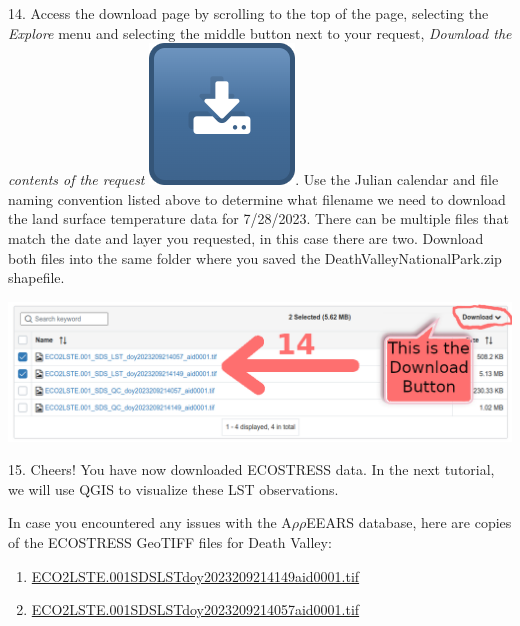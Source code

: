 \documentclass[oneside,a4paper,11pt,explicit]{book}
\begin{document}
14. Access the download page by scrolling to the top of the page, selecting the \textit{Explore} menu and selecting the middle button next to your request, \textit{Download the contents of the request} \includegraphics[height=\fontcharht\font`\B]{DownloadButton.png}. Use the Julian calendar and file naming convention listed above to determine what filename we need to download the land surface temperature data for 7/28/2023. There can be multiple files that match the date and layer you requested, in this case there are two. Download both files into the same folder where you saved the DeathValleyNationalPark.zip shapefile.

\centerline{\includegraphics[width=\textwidth]{DownloadInstructions.png}}

15. Cheers! You have now downloaded ECOSTRESS data. In the next tutorial, we will use QGIS to visualize these LST observations.

\vfill

\begin{tcolorbox}[colback=yellow!5!white,title=\textbf{Datafiles}]
	\large
	In case you encountered any issues with the A$\rho\rho$EEARS database, here are copies of the ECOSTRESS GeoTIFF files for Death Valley:
	\begin{enumerate}
		\item \href{https://jeremydforsythe.github.io/icecream-tutorials/Tutorial4_AccessingRemoteSensingDataWithAppears/ECO2LSTE.001_SDS_LST_doy2023209214149_aid0001.tif}{\small ECO2LSTE.001\textunderscore SDS\textunderscore LST\textunderscore doy2023209214149\textunderscore aid0001.tif}
		\item \href{https://jeremydforsythe.github.io/icecream-tutorials/Tutorial4_AccessingRemoteSensingDataWithAppears/ECO2LSTE.001_SDS_LST_doy2023209214057_aid0001.tif}{\small ECO2LSTE.001\textunderscore SDS\textunderscore LST\textunderscore doy2023209214057\textunderscore aid0001.tif}
	\end{enumerate}
\end{tcolorbox}
\end{document}
